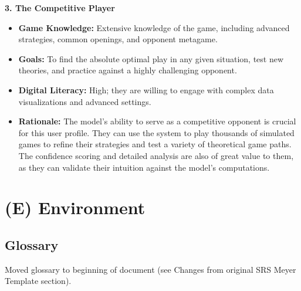 \documentclass{article}
\begin{document}
\noindent\textbf{3. The Competitive Player}
\begin{itemize}
    \item \textbf{Game Knowledge:} Extensive knowledge of the game, including advanced strategies, common openings, and opponent metagame.
    \item \textbf{Goals:} To find the absolute optimal play in any given situation, test new theories, and practice against a highly challenging opponent.
    \item \textbf{Digital Literacy:} High; they are willing to engage with complex data visualizations and advanced settings.
    \item \textbf{Rationale:} The \AI{} model's ability to serve as a competitive opponent is crucial for this user profile. They can use the system to play thousands of simulated games to refine their strategies and test a variety of theoretical game paths. The confidence scoring and detailed analysis are also of great value to them, as they can validate their intuition against the model's computations.
\end{itemize}


\newpage{}



\section*{(E) Environment}\label{sec:srs-environment}
\renewcommand{\thesubsection}{E.\arabic{subsection}}
\renewcommand{\theHsubsection}{E.\arabic{subsection}}
\setcounter{subsection}{0}

\subsection{Glossary}\label{subsec:glossary}
\raggedright Moved glossary to beginning of document (see Changes from original SRS Meyer Template section).
\end{document}
